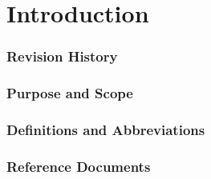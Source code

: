 \section{Introduction} %
\label{sec:introduction}

\subsubsection{Revision History} %
\label{ssub:revision_history}

\subsubsection{Purpose and Scope} %
\label{ssub:purpose_and_scope}

\subsubsection{Definitions and Abbreviations} %
\label{ssub:definitions_and_abbreviations}

\subsubsection{Reference Documents} %
\label{ssub:reference_documents}

